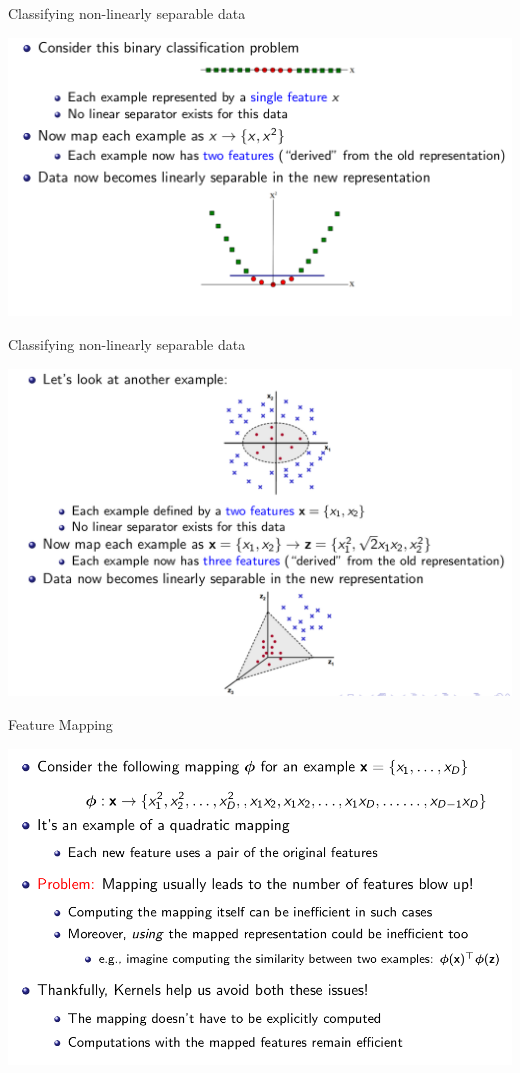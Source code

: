 \documentclass{beamer}
\begin{document}
\begin{frame}{Classifying non-linearly separable data}
    \begin{center}
        \includegraphics[scale=0.32]{kernels2.png}
    \end{center}
\end{frame}
\begin{frame}{Classifying non-linearly separable data}
    \begin{center}
        \includegraphics[scale=0.32]{kernels3.png}
    \end{center}
\end{frame}
\begin{frame}{Feature Mapping}
    \begin{center}
        \includegraphics[scale=0.32]{kernels4.png}
    \end{center}
\end{frame}
\end{document}

